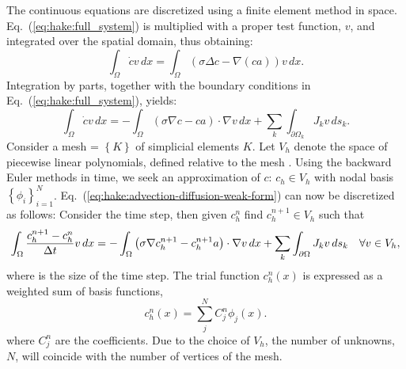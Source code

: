 The continuous equations are discretized using a finite element method
in space. Eq.~(\ref{eq:hake:full_system}) is multiplied with a proper
test function, $v$, and integrated over the spatial domain, thus
obtaining:
\begin{equation}
  \label{eq:hake:advection-diffusion-weak-form-0}
  \int_\Omega\dot{c}v\,dx = \int_\Omega \left(\sigma\Delta c-\nabla(ca)\right) v\,dx.
\end{equation}
Integration by parts, together with the boundary conditions in
Eq.~(\ref{eq:hake:full_system}), yields:
\begin{equation}
  \label{eq:hake:advection-diffusion-weak-form}
  \int_\Omega\dot{c}v\,dx = -\int_\Omega \left(\sigma\nabla c-ca\right)\cdot\nabla v\,dx + \sum_k\int_{\partial\Omega_k} J_kv\,ds_k.
\end{equation}
Consider a mesh \T = $\left\{K\right\}$ of simplicial elements
$K$. Let $V_h$ denote the space of piecewise linear polynomials,
defined relative to the mesh \T. Using the backward Euler methods in
time, we seek an approximation of $c$: $c_h\in V_h$ with nodal basis
$\left\{\phi_i\right\}^N_{i=1}$. Eq.~(\ref{eq:hake:advection-diffusion-weak-form})
can now be discretized as follows: Consider the \nth time step, then
given $c_h^n$ find $c_h^{n+1} \in V_h$ such that
\begin{equation}
  \label{eq:hake:advection-diffusion-weak-discrete-form}
  \int_{\Omega} \frac{c_h^{n+1}-c_h^{n}}{\Delta{}t}v\,dx = -\int_{\Omega} \left(\sigma\nabla c_h^{n+1}-c_h^{n+1}a\right)\cdot\nabla v\,dx + \sum_k\int_{\partial\Omega} J_kv\,ds_{k}\quad\forall v \in V_h,
\end{equation}
where \Dt is the size of the time step. The trial function $c^n_h(x)$
is expressed as a weighted sum of basis functions,
\begin{equation}
  \label{eq:hake:discrete-solution}
  c^n_h(x) = \sum^N_j C_j^n\phi_j(x).
\end{equation}
where $C_j^n$ are the coefficients. Due to the choice of $V_h$, the
number of unknowns, $N$, will coincide with the number of vertices of
the mesh.\par

